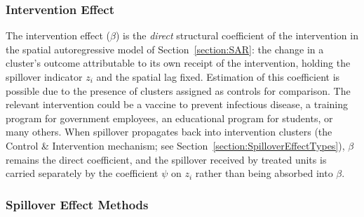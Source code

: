 \documentclass{article}[11pt]
\begin{document}
\subsubsection{Intervention Effect}\label{Section:InterventionEffect}

The intervention effect ($\beta$) is the \textit{direct} structural coefficient of the intervention in the spatial autoregressive model of Section~\ref{section:SAR}: the change in a cluster's outcome attributable to its own receipt of the intervention, holding the spillover indicator $z_i$ and the spatial lag fixed. Estimation of this coefficient is possible due to the presence of clusters assigned as controls for comparison. The relevant intervention could be a vaccine to prevent infectious disease, a training program for government employees, an educational program for students, or many others. When spillover propagates back into intervention clusters (the Control \& Intervention mechanism; see Section~\ref{section:SpilloverEffectTypes}), $\beta$ remains the direct coefficient, and the spillover received by treated units is carried separately by the coefficient $\psi$ on $z_i$ rather than being absorbed into $\beta$.


\subsubsection{Spillover Effect Methods}\label{Section:SpilloverEffectMethods}
\end{document}
